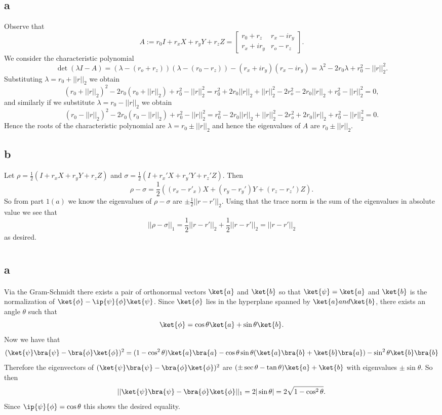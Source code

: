\documentclass[letterpaper,12pt,oneside,onecolumn]{article}
\begin{document}
\section{}
\subsection{a}
Observe that 
$$A:= r_0I + r_xX + r_yY + r_zZ = \begin{bmatrix}
r_0 + r_z & r_x - ir_y \\ r_x + ir_y & r_o -r_z
\end{bmatrix}.$$
We consider the characteristic polynomial
$$\det(\lambda I - A) = (\lambda - (r_o+r_z))(\lambda - (r_0 -r_z)) -(r_x+ir_y)(r_x-ir_y) = \lambda^2 - 2r_0\lambda +r_0^2 - ||r||_2^2.$$
Substituting $\lambda = r_0 + ||r||_2$ we obtain
$$(r_0 + ||r||_2)^2 - 2r_0(r_0 + ||r||_2) + r_0^2 - ||r||_2^2 = r_0^2 + 2r_0||r||_2 + ||r||_2^2 - 2r_o^2 -2r_0||r||_2 +r_0^2 - ||r||_2^2 = 0,$$
and similarly if we substitute $\lambda=r_0 - ||r||_2$ we obtain
$$(r_0 - ||r||_2)^2 - 2r_0(r_0 -||r||_2) + r_0^2 - ||r||_2^2 = r_0^2 - 2r_0||r||_2 + ||r||_2^2 - 2r_o^2 +2r_0||r||_2 +r_0^2 - ||r||_2^2 = 0.$$
Hence the roots of the characteristic polynomial are $\lambda = r_0 \pm ||r||_2$ and hence the eigenvalues of $A$ are  $r_0 \pm ||r||_2$.
\subsection{b}
Let $\rho = \frac{1}{2}(I + r_xX + r_yY + r_zZ)$ and $\sigma =  \frac{1}{2}(I + r_x'X + r_y'Y + r_z'Z)$. Then
$$\rho-\sigma =\frac{1}{2}( (r_x-r'_x)X + (r_y-r_y')Y + (r_z-r_z')Z).$$
So from part $1(a)$ we know the eigenvalues of $\rho-\sigma$ are $\pm \frac{1}{2}||r - r'||_2.$
Using that the trace norm is the sum of the eigenvalues in absolute value we see that
$$||\rho-\sigma||_1 = \frac{1}{2}||r-r'||_2 + \frac{1}{2}||r-r'||_2 = ||r-r'||_2$$
as desired.
\section{}
\subsection{a}
\paragraph{}
Via the Gram-Schmidt there exists a pair of orthonormal vectors $\ket{a}$ and $\ket{b}$ so that $\ket{\psi}=\ket{a}$ and $\ket{b}$ is the normalization of $\ket{\phi} - \ip{\psi}{\phi}\ket{\psi}$. Since $\ket{\phi}$ lies in the hyperplane spanned by $\ket{a} and \ket{b}$, there exists an angle $\theta$ such that 
$$\ket{\phi} = \cos \theta \ket{a} + \sin \theta\ket{b}.$$
Now we have that
$$(\ket{\psi}\bra{\psi} - \bra{\phi}\ket{\phi})^2 = (1-\cos^2\theta)\ket{a}\bra{a} - \cos\theta\sin\theta(\ket{a}\bra{b} + \ket{b}\bra{a}) -\sin^2\theta\ket{b}\bra{b}$$
Therefore the eigenvectors of $(\ket{\psi}\bra{\psi} - \bra{\phi}\ket{\phi})^2$ are $(\pm\sec\theta - \tan\theta)\ket{a} + \ket{b}$ with eigenvalues $\pm\sin\theta$. So then
$$||\ket{\psi}\bra{\psi} - \bra{\phi}\ket{\phi}||_1 = 2|\sin\theta| = 2\sqrt{1-\cos^2\theta}.$$
Since $\ip{\psi}{\phi} = \cos\theta$ this shows the desired equality.
\end{document}
